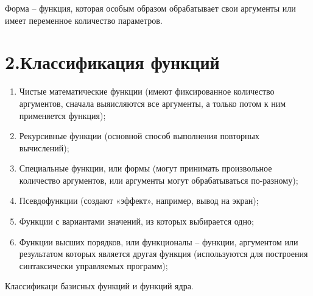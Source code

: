 \documentclass[12pt]{report}
\begin{document}
	Форма -- функция, которая особым образом обрабатывает свои аргументы или имеет переменное количество параметров.
	
	
	
	
	\section*{2.Классификация функций}
	
	
	\begin{enumerate}
		\item Чистые  математические функции (имеют фиксированное количество аргументов, сначала выяисляются все аргументы, а только потом к ним применяется функция);
		\item Рекурсивные функции (основной способ выполнения повторных вычислений);
		\item Специальные функции, или формы (могут принимать произвольное количество аргументов, или аргументы могут обрабатываться по-разному);
		\item Псевдофункции (создают «эффект», например, вывод на экран);
		\item Функции с вариантами значений, из которых выбирается одно;
		\item Функции высших порядков, или функционалы --  функции, аргументом или  результатом которых является другая функция (используются для построения синтаксически управляемых программ);
	\end{enumerate}
	
	Классификаци базисных функций и функций ядра.
	
\end{document}
